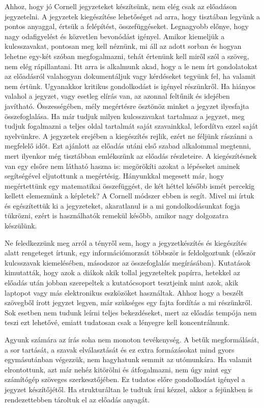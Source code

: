 \documentclass[../Main.tex]{subfiles}
\begin{document}
\begin{flushleft}
Ahhoz, hogy jó Cornell jegyzeteket készítsünk, nem elég csak az előadáson jegyzetelni.
A jegyzetek kiegészítése lehetőséget ad arra, hogy tisztában legyünk a pontos anyaggal,
értsük a felépítést, összefüggéseket. Legnagyobb előnye, hogy nagy odafigyelést és
közvetlen bevonódást igényel. Amikor kiemeljük a kulcsszavakat, pontosan meg kell
néznünk, mi áll az adott sorban és hogyan lehetne egy-két szóban megfogalmazni, tehát
értenünk kell miről szól a szöveg, nem elég rápillantani. Itt arra is alkalmunk akad, hogy a
le nem írt gondolatokat az előadásról valahogyan dokumentáljuk vagy kérdéseket tegyünk
fel, ha valamit nem értünk. Ugyanakkor kritikus gondolkodást is igényel részünkről. Ha
hiányos valahol a jegyzet, vagy esetleg elírás van, az azonnal feltűnik és idejében
javítható. Összességében, mély megértésre ösztönöz minket a jegyzet ilyesfajta
összefoglalása. Ha már tudjuk milyen kulcsszavakat tartalmaz a jegyzet, meg tudjuk
fogalmazni a teljes oldal tartalmát saját szavainkkal, lefordítva ezzel saját nyelvünkre.
A jegyzetek erejében a kiegészítés rejlik, ezért ne féljünk rászánni a megfelelő időt. Ezt
ajánlott az előadás utáni első szabad alkalommal megtenni, mert ilyenkor még tisztábban
emlékszünk az előadás részleteire. A kiegészítésnek van egy elsőre nem látható haszna is:
megörökíti azokat a lépéseket aminek segítségével eljutottunk a megértésig. Hányunkkal
megesett már, hogy megértettünk egy matematikai összefüggést, de két héttel később
ismét percekig kellett elemeznünk a képletek? A Cornell módszer ebben is segít. Mivel mi
írtuk és egészítettük ki a jegyzeteket, akaratlanul is a mi gondolkodásunkat fogja tükrözni,
ezért is használhatók remekül később, amikor nagy dolgozatra készülünk.
\end{flushleft}

\begin{flushleft}
Ne feledkezzünk meg arról a tényről sem, hogy a jegyzetkészítés és kiegészítés alatt
rengeteget írtunk, egy információmorzsát többször is feldolgoztunk (először kulcsszavak
kiemelésében, másodszor az összefoglalás megírásában). Kutatások kimutatták, hogy azok
a diákok akik tollal jegyzeteltek papírra, hetekkel az előadás után jobban szerepeltek a
kutatócsoport tesztjeink mint azok, akik laptopot vagy más elektronikus eszközöket
használtak. Ahhoz hogy a beszélt szövegből írott jegyzet legyen, már szükséges egy fajta
fordítás a mi részünkről. Sok esetben nem tudunk leírni teljes bekezdéseket, mert az
előadás tempója nem teszi ezt lehetővé, emiatt tudatosan csak a lényegre kell
koncentrálnunk.

Agyunk számára az írás soha nem monoton tevékenység. A betűk megformálását, a sor
tartását, a szavak elválasztását és ez extra formázásokat mind gyors egymásutánban
végezzük, nem hagyhatunk semmit az utómunkára. Ha valamit elrontottunk, azt már
nehéz kitörölni és átfogalmazni, nem úgy mint egy számítógép szöveges szerkesztőjében.
Ez tudatos előre gondolkodást igényel a jegyzet készítőjétől. Ha strukturáltan le tudtuk
írni kézzel, akkor a fejünkben is rendezettebben tároltuk el az előadás anyagát.
\end{flushleft}
\end{document}
